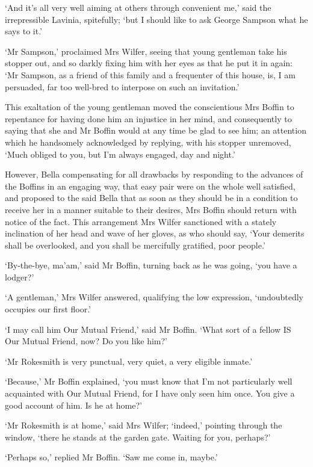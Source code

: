 ‘And it’s all very well aiming at others through convenient me,’ said
the irrepressible Lavinia, spitefully; ‘but I should like to ask George
Sampson what he says to it.’

‘Mr Sampson,’ proclaimed Mrs Wilfer, seeing that young gentleman take
his stopper out, and so darkly fixing him with her eyes as that he put
it in again: ‘Mr Sampson, as a friend of this family and a frequenter of
this house, is, I am persuaded, far too well-bred to interpose on such
an invitation.’

This exaltation of the young gentleman moved the conscientious Mrs
Boffin to repentance for having done him an injustice in her mind, and
consequently to saying that she and Mr Boffin would at any time be glad
to see him; an attention which he handsomely acknowledged by replying,
with his stopper unremoved, ‘Much obliged to you, but I’m always
engaged, day and night.’

However, Bella compensating for all drawbacks by responding to the
advances of the Boffins in an engaging way, that easy pair were on the
whole well satisfied, and proposed to the said Bella that as soon as
they should be in a condition to receive her in a manner suitable to
their desires, Mrs Boffin should return with notice of the fact. This
arrangement Mrs Wilfer sanctioned with a stately inclination of her
head and wave of her gloves, as who should say, ‘Your demerits shall be
overlooked, and you shall be mercifully gratified, poor people.’

‘By-the-bye, ma’am,’ said Mr Boffin, turning back as he was going, ‘you
have a lodger?’

‘A gentleman,’ Mrs Wilfer answered, qualifying the low expression,
‘undoubtedly occupies our first floor.’

‘I may call him Our Mutual Friend,’ said Mr Boffin. ‘What sort of a
fellow IS Our Mutual Friend, now? Do you like him?’

‘Mr Rokesmith is very punctual, very quiet, a very eligible inmate.’

‘Because,’ Mr Boffin explained, ‘you must know that I’m not particularly
well acquainted with Our Mutual Friend, for I have only seen him once.
You give a good account of him. Is he at home?’

‘Mr Rokesmith is at home,’ said Mrs Wilfer; ‘indeed,’ pointing through
the window, ‘there he stands at the garden gate. Waiting for you,
perhaps?’

‘Perhaps so,’ replied Mr Boffin. ‘Saw me come in, maybe.’

